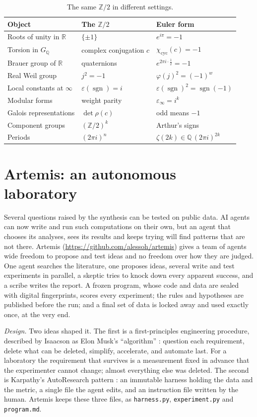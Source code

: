 \documentclass[11pt]{amsart}
\numberwithin{equation}{section}
\newcommand{\Q}{\mathbb{Q}}
\newcommand{\R}{\mathbb{R}}
\newcommand{\Z}{\mathbb{Z}}
\newcommand{\sgn}{\operatorname{sgn}}
\newcommand{\cyc}{\mathrm{cyc}}
\begin{document}
\begin{table}[ht]
\centering\small
\caption{The same $\Z/2$ in different settings.}\label{tab:master}
\begin{tabular}{@{}lll@{}}
\toprule
Object & The $\Z/2$ & Euler form\\
\midrule
Roots of unity in $\R$ & $\{\pm1\}$ & $e^{i\pi}=-1$\\
Torsion in $G_\Q$ & complex conjugation $c$ & $\chi_\cyc(c)=-1$\\
Brauer group of $\R$ & quaternions & $e^{2\pi i\cdot\frac12}=-1$\\
Real Weil group & $j^2=-1$ & $\varphi(j)^2=(-1)^w$\\
Local constants at $\infty$ & $\varepsilon(\sgn)=i$ & $\varepsilon(\sgn)^2=\sgn(-1)$\\
Modular forms & weight parity & $\varepsilon_\infty=i^k$\\
Galois representations & $\det\rho(c)$ & odd means $-1$\\
Component groups & $(\Z/2)^k$ & Arthur's signs\\
Periods & $(2\pi i)^n$ & $\zeta(2k)\in\Q\,(2\pi i)^{2k}$\\
\bottomrule
\end{tabular}
\end{table}

\section{Artemis: an autonomous laboratory}\label{sec:artemis}

Several questions raised by the synthesis can be tested on public data. AI agents can now write and run such computations on their own, but an agent that chooses its analyses, sees its results and keeps trying will find patterns that are not there. Artemis (\url{https://github.com/alessoh/artemis}) gives a team of agents wide freedom to propose and test ideas and no freedom over how they are judged. One agent searches the literature, one proposes ideas, several write and test experiments in parallel, a skeptic tries to knock down every apparent success, and a scribe writes the report. A frozen program, whose code and data are sealed with digital fingerprints, scores every experiment; the rules and hypotheses are published before the run; and a final set of data is locked away and used exactly once, at the very end.

\emph{Design.} Two ideas shaped it. The first is a first-principles engineering procedure, described by Isaacson as Elon Musk's ``algorithm'' \cite{Isaacson2023}: question each requirement, delete what can be deleted, simplify, accelerate, and automate last. For a laboratory the requirement that survives is a measurement fixed in advance that the experimenter cannot change; almost everything else was deleted. The second is Karpathy's AutoResearch pattern \cite{Karpathy2026}: an immutable harness holding the data and the metric, a single file the agent edits, and an instruction file written by the human. Artemis keeps these three files, as \texttt{harness.py}, \texttt{experiment.py} and \texttt{program.md}.
\end{document}
